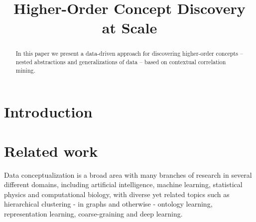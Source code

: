 \documentclass[conference]{IEEEtran}
\begin{document}
\title{Higher-Order Concept Discovery at Scale }

\author{
\and
{}
\and
{}
}

\maketitle

\begin{abstract}
In this paper we present a data-driven approach for discovering higher-order concepts --
 nested abstractions and generalizations of data -- based on contextual correlation mining. 

\end{abstract}


\section{Introduction}
\label{sec:introduction}


\section{Related work}
\label{sec:related work}

Data conceptualization is a broad area with many branches of research in several different domains, including artificial 
intelligence, machine learning, statistical physics and computational biology, with diverse yet related topics such as 
hierarchical clustering - in graphs and otherwise - ontology learning, representation learning, coarse-graining and deep 
learning.
\end{document}
